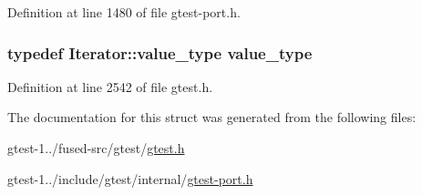 \-Definition at line 1480 of file gtest-\/port.\-h.

\hypertarget{structtesting_1_1internal_1_1IteratorTraits_a2c72bd0c215dc4f0dc7f1b98869fee3d}{
\subsubsection[{value\-\_\-type}]{\setlength{\rightskip}{0pt plus 5cm}typedef \-Iterator\-::value\-\_\-type {\bf value\-\_\-type}}}\label{d5/dc7/structtesting_1_1internal_1_1IteratorTraits_a2c72bd0c215dc4f0dc7f1b98869fee3d}


\-Definition at line 2542 of file gtest.\-h.



\-The documentation for this struct was generated from the following files\-:\begin{DoxyCompactItemize}
\item 
gtest-\/1../fused-\/src/gtest/\hyperlink{fused-src_2gtest_2gtest_8h}{gtest.\-h}\item 
gtest-\/1../include/gtest/internal/\hyperlink{gtest-port_8h}{gtest-\/port.\-h}\end{DoxyCompactItemize}
